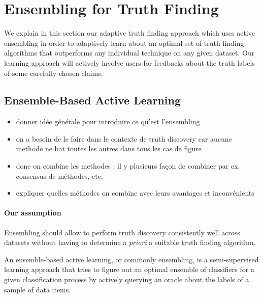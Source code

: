 \section{Ensembling for Truth Finding}\label{ensembling}
We explain in this section our adaptive truth finding approach which uses active ensembling in order to 
adaptively learn about an optimal set of truth finding algorithms that outperforms any individual
technique on any given dataset. Our learning approach will actively involve users for 
feedbacks about the truth labels of some carefully chosen claims.

\subsection{Ensemble-Based Active Learning}
\begin{itemize}
\item donner idée générale pour introduire  ce qu'est l'ensembling
\item on a besoin de le faire dans le contexte de truth discovery car aucune methode ne bat toutes les autres dans tous les cas de figure
\item donc on combine les methodes : il y plusieurs façon de combiner par ex. consensus de méthodes, etc.
\item expliquer quelles méthodes on combine avec leurs avantages et inconvénients
\end{itemize}

\medskip

\paragraph*{Our assumption} Ensembling should allow to perform truth discovery consistently well across datasets
without having to determine a \emph{priori} a suitable truth finding algorithm.

\medskip
An ensemble-based active learning, or commonly ensembling, is a semi-supervised learning approach that tries
to figure out an optimal ensemble of classifiers for a given classification process by actively querying an 
oracle about the labels of a sample of data items.


